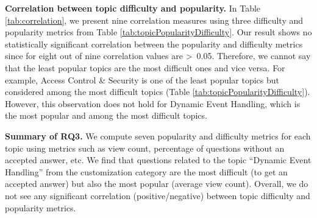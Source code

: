 \nd\textbf{Correlation between topic difficulty and popularity.} 
In Table \ref{tab:correlation}, we present nine
correlation measures using three difficulty and popularity metrics from Table
\ref{tab:topicPopularityDifficulty}. Our result shows no
statistically significant correlation between the popularity and difficulty
metrics since for eight out of nine correlation values are \textgreater~0.05. Therefore, we cannot say that the least popular topics are the most difficult
ones and vice versa. For example, Access Control \& Security is one of
the least popular topics but considered among the most difficult topics (Table
\ref{tab:topicPopularityDifficulty}). However, this observation does not hold for
Dynamic Event Handling, which is the most popular and among
the most difficult topics.  


\begin{tcolorbox}[flushleft upper,boxrule=1pt,arc=0pt,left=0pt,right=0pt,top=0pt,bottom=0pt,colback=white,after=\ignorespacesafterend\par\noindent]
\noindent\textbf{Summary of RQ3.} We compute seven popularity and difficulty metrics for each topic using metrics such as  
view count, percentage of questions without an accepted answer, etc. We find that questions related to the topic ``Dynamic Event Handling'' from the 
customization category are the most difficult (to get an accepted answer) but also the most popular (average view count). Overall, we do not see any significant correlation (positive/negative) between topic difficulty and popularity metrics. 
\end{tcolorbox}
